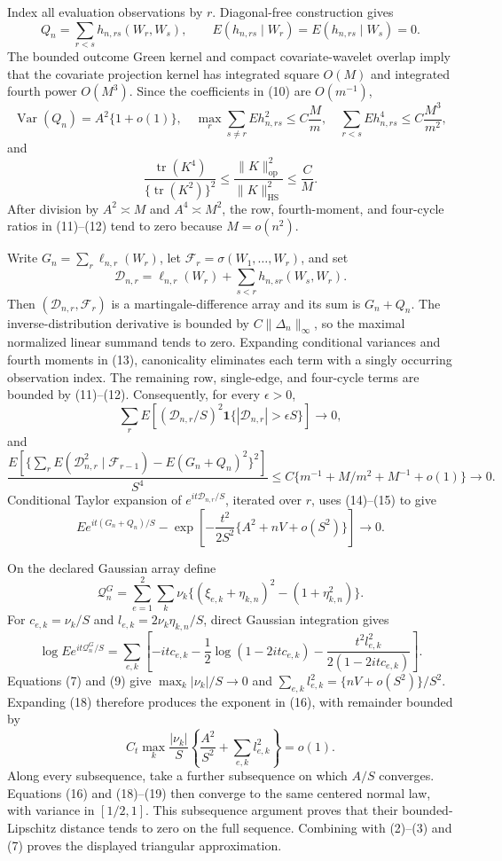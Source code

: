 Index all evaluation observations by \(r\). Diagonal-free construction gives
\[
Q_n=\sum_{r<s}h_{n,rs}(W_r,W_s),\qquad
E(h_{n,rs}\mid W_r)=E(h_{n,rs}\mid W_s)=0.           \tag{10}
\]
The bounded outcome Green kernel and compact covariate-wavelet overlap imply that the covariate projection kernel has integrated square \(O(M)\) and integrated fourth power \(O(M^3)\). Since the coefficients in (10) are \(O(m^{-1})\),
\[
\operatorname{Var}(Q_n)=A^2\{1+o(1)\},\quad
\max_r\sum_{s\ne r}Eh_{n,rs}^2\le C\frac M m,\quad
\sum_{r<s}Eh_{n,rs}^4\le C\frac{M^3}{m^2},           \tag{11}
\]
and
\[
\frac{\operatorname{tr}(K^4)}
{\{\operatorname{tr}(K^2)\}^2}
\le\frac{\|K\|_{\mathrm{op}}^2}{\|K\|_{\mathrm{HS}}^2}
\le\frac C M.                                        \tag{12}
\]
After division by \(A^2\asymp M\) and \(A^4\asymp M^2\), the row, fourth-moment, and four-cycle ratios in (11)--(12) tend to zero because \(M=o(n^2)\).

Write \(G_n=\sum_r\ell_{n,r}(W_r)\), let \(\mathcal F_r=\sigma(W_1,\ldots,W_r)\), and set
\[
\mathcal D_{n,r}=\ell_{n,r}(W_r)+
\sum_{s<r}h_{n,sr}(W_s,W_r).                         \tag{13}
\]
Then \((\mathcal D_{n,r},\mathcal F_r)\) is a martingale-difference array and its sum is \(G_n+Q_n\). The inverse-distribution derivative is bounded by \(C\|\Delta_n\|_\infty\), so the maximal normalized linear summand tends to zero. Expanding conditional variances and fourth moments in (13), canonicality eliminates each term with a singly occurring observation index. The remaining row, single-edge, and four-cycle terms are bounded by (11)--(12). Consequently, for every \(\epsilon>0\),
\[
\sum_rE\!\left[(\mathcal D_{n,r}/S)^2
\mathbf1\{|\mathcal D_{n,r}|>\epsilon S\}\right]\to0, \tag{14}
\]
and
\[
\frac{E[\{\sum_rE(\mathcal D_{n,r}^2\mid\mathcal F_{r-1})
-E(G_n+Q_n)^2\}^2]}{S^4}
\le C\{m^{-1}+M/m^2+M^{-1}+o(1)\}\to0.              \tag{15}
\]
Conditional Taylor expansion of \(e^{it\mathcal D_{n,r}/S}\), iterated over \(r\), uses (14)--(15) to give
\[
Ee^{it(G_n+Q_n)/S}
-\exp\left[-\frac{t^2}{2S^2}\{A^2+nV+o(S^2)\}\right]\to0. \tag{16}
\]

On the declared Gaussian array define
\[
\mathcal Q_n^G=\sum_{e=1}^2\sum_k\nu_k
\{(\xi_{e,k}+\eta_{k,n})^2-(1+\eta_{k,n}^2)\}.       \tag{17}
\]
For \(c_{e,k}=\nu_k/S\) and \(l_{e,k}=2\nu_k\eta_{k,n}/S\), direct Gaussian integration gives
\[
\log Ee^{it\mathcal Q_n^G/S}
=\sum_{e,k}\left[-itc_{e,k}-\frac12\log(1-2itc_{e,k})
-\frac{t^2l_{e,k}^2}{2(1-2itc_{e,k})}\right].        \tag{18}
\]
Equations (7) and (9) give \(\max_k|\nu_k|/S\to0\) and \(\sum_{e,k}l_{e,k}^2=\{nV+o(S^2)\}/S^2\). Expanding (18) therefore produces the exponent in (16), with remainder bounded by
\[
C_t\max_k\frac{|\nu_k|}{S}
\left\{\frac{A^2}{S^2}+\sum_{e,k}l_{e,k}^2\right\}=o(1). \tag{19}
\]
Along every subsequence, take a further subsequence on which \(A/S\) converges. Equations (16) and (18)--(19) then converge to the same centered normal law, with variance in \([1/2,1]\). This subsequence argument proves that their bounded-Lipschitz distance tends to zero on the full sequence. Combining with (2)--(3) and (7) proves the displayed triangular approximation.

